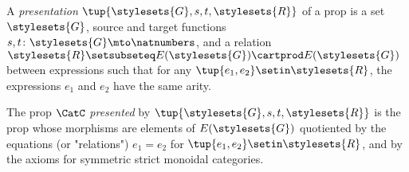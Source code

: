 \begin{definition}\label{def:presentation-of-a-prop}
    A \emph{presentation} $\tup{\stylesets{G}, s, t, \stylesets{R}}$ of a prop is a set $\stylesets{G}$, source and target functions $s, t \colon \stylesets{G} \mto \natnumbers$, and a relation $\stylesets{R} \setsubseteq E(\stylesets{G}) \cartprod E(\stylesets{G})$ between expressions such that for any $\tup{e_1, e_2} \setin\stylesets{R}$, the expressions $e_1$ and $e_2$ have the same arity.

    The prop $\CatC$ \emph{presented} by $\tup{\stylesets{G}, s, t, \stylesets{R}}$ is the prop whose morphisms are elements of $E(\stylesets{G})$ quotiented by the equations (or "relations") $e_1 = e_2$ for $\tup{e_1, e_2} \setin\stylesets{R}$, and by the axioms for symmetric strict monoidal categories.
\end{definition}
